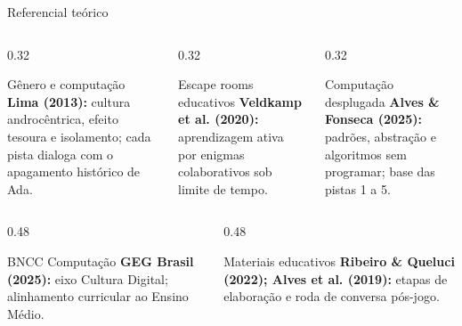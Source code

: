 \documentclass[aspectratio=169, 10pt, t]{beamer}
\begin{document}
\begin{frame}{Referencial teórico}
  \begin{columns}[T]
    \begin{column}{0.32\textwidth}
      \begin{card}{Gênero e computação}
        \scriptsize
        \textbf{Lima (2013):} cultura androcêntrica, efeito tesoura e isolamento; cada pista dialoga com o apagamento histórico de Ada.
      \end{card}
    \end{column}
    \begin{column}{0.32\textwidth}
      \begin{card}{Escape rooms educativos}
        \scriptsize
        \textbf{Veldkamp et al. (2020):} aprendizagem ativa por enigmas colaborativos sob limite de tempo.
      \end{card}
    \end{column}
    \begin{column}{0.32\textwidth}
      \begin{card}{Computação desplugada}
        \scriptsize
        \textbf{Alves \& Fonseca (2025):} padrões, abstração e algoritmos sem programar; base das pistas 1 a 5.
      \end{card}
    \end{column}
  \end{columns}
  \vspace{0.3em}
  \begin{columns}[T]
    \begin{column}{0.48\textwidth}
      \begin{card}{BNCC Computação}
        \scriptsize
        \textbf{GEG Brasil (2025):} eixo Cultura Digital; alinhamento curricular ao Ensino Médio.
      \end{card}
    \end{column}
    \begin{column}{0.48\textwidth}
      \begin{card}{Materiais educativos}
        \scriptsize
        \textbf{Ribeiro \& Queluci (2022); Alves et al. (2019):} etapas de elaboração e roda de conversa pós-jogo.
      \end{card}
    \end{column}
  \end{columns}
\end{frame}
\end{document}
